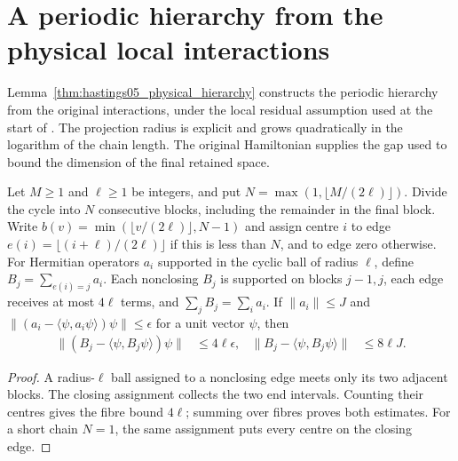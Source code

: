 \section{A periodic hierarchy from the physical local interactions}
\label{sec:hastings05_physical_hierarchy}

Lemma~\ref{thm:hastings05_physical_hierarchy} constructs the periodic
hierarchy from the original interactions, under the local residual
assumption used at the start of
\cite[Section~III, lines 493--507]{Hastings2006Solving}. The projection
radius is explicit and grows quadratically in the logarithm of the chain
length. The original Hamiltonian supplies the gap used to bound the
dimension of the final retained space.

\begin{lemma}
    \label{lem:hastings05_rounded_pairs}
    \leanok
    Let $M\ge1$ and $\ell\ge1$ be integers, and put
    $N=\max(1,\lfloor M/(2\ell)\rfloor)$. Divide the cycle into $N$
    consecutive blocks, including the remainder in the final block.
    Write $b(v)=\min(\lfloor v/(2\ell)\rfloor,N-1)$ and assign centre
    $i$ to edge $e(i)=\lfloor(i+\ell)/(2\ell)\rfloor$ if this is less
    than $N$, and to edge zero otherwise. For Hermitian operators $a_i$ supported
    in the cyclic ball of radius $\ell$, define
    $B_j=\sum_{e(i)=j}a_i$. Each nonclosing $B_j$ is supported on
    blocks $j-1,j$, each edge receives at most $4\ell$ terms, and
    $\sum_jB_j=\sum_i a_i$. If $\|a_i\|\le J$ and
    $\|(a_i-\langle\psi,a_i\psi\rangle)\psi\|\le\epsilon$ for a
    unit vector $\psi$, then
    \begin{align}
        \|(B_j-\langle\psi,B_j\psi\rangle)\psi\|
           &\le4\ell\epsilon,&
        \|B_j-\langle\psi,B_j\psi\rangle\|
           &\le8\ell J.
        \label{eq:hastings05_rounded_pairs}
    \end{align}
\end{lemma}
\begin{proof}\leanok
    A radius-$\ell$ ball assigned to a nonclosing edge meets only its
    two adjacent blocks. The closing assignment collects the two end
    intervals. Counting their centres gives the fibre bound $4\ell$;
    summing over fibres proves both estimates. For a short chain $N=1$,
    the same assignment puts every centre on the closing edge.
\end{proof}

